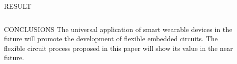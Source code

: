 \documentclass[final]{beamer}
\begin{document}
\begin{frame}[t, fragile = singleslide]{}
\begin{columns}[t]
\begin{column}{0.945\textwidth}
\begin{block}{RESULT}
\end{block}

\end{column}

\end{columns}

\begin{columns}[t]

\begin{column}{0.45\textwidth}

\begin{block}{CONCLUSIONS}
The universal application of smart wearable devices in the future will promote the development of flexible embedded circuits. The flexible circuit process proposed in this paper will show its value in the near future.
\end{block}

\end{column}

\begin{column}{0.45\textwidth}


\end{column}
\end{columns}
\end{frame}
\end{document}
